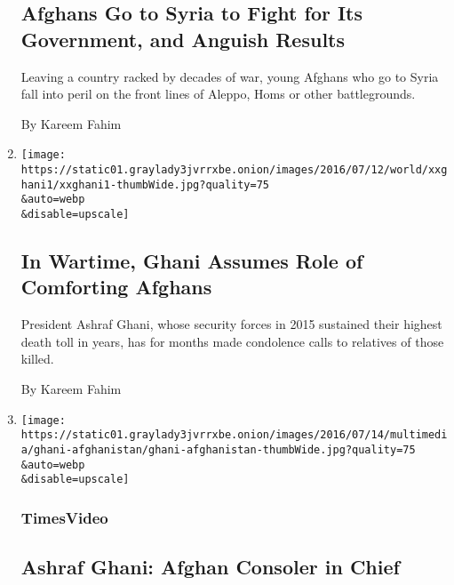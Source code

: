 \begin{enumerate}
{  \subsection{Afghans Go to Syria to Fight for Its Government, and
  Anguish
  Results}\label{afghans-go-to-syria-to-fight-for-its-government-and-anguish-results}}

  Leaving a country racked by decades of war, young Afghans who go to
  Syria fall into peril on the front lines of Aleppo, Homs or other
  battlegrounds.

  By Kareem Fahim
\item
  \href{/2016/07/17/world/asia/afghanistan-ashraf-ghani-taliban-victims.html}{}

  \texttt{[image: https://static01.graylady3jvrrxbe.onion/images/2016/07/12/world/xxghani1/xxghani1-thumbWide.jpg?quality=75\\\&auto=webp\\\&disable=upscale]}

  \hypertarget{in-wartime-ghani-assumes-role-of-comforting-afghans}{%
  \subsection{In Wartime, Ghani Assumes Role of Comforting
  Afghans}\label{in-wartime-ghani-assumes-role-of-comforting-afghans}}

  President Ashraf Ghani, whose security forces in 2015 sustained their
  highest death toll in years, has for months made condolence calls to
  relatives of those killed.

  By Kareem Fahim
\item
  \href{/video/world/asia/100000004532883/ashraf-ghani-afghan-consoler-in-chief.html}{}

  \texttt{[image: https://static01.graylady3jvrrxbe.onion/images/2016/07/14/multimedia/ghani-afghanistan/ghani-afghanistan-thumbWide.jpg?quality=75\\\&auto=webp\\\&disable=upscale]}

  \hypertarget{timesvideo}{%
  \subsubsection{TimesVideo}\label{timesvideo}}

  \hypertarget{ashraf-ghani-afghan-consoler-in-chief}{%
  \subsection{Ashraf Ghani: Afghan Consoler in
  Chief}\label{ashraf-ghani-afghan-consoler-in-chief}}


\end{enumerate}

